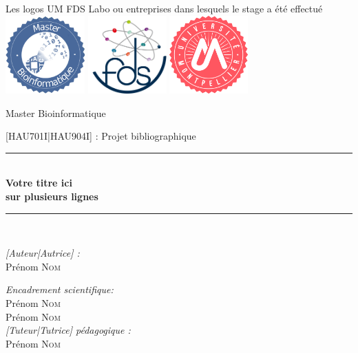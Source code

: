 \documentclass[french,a4paper,11pt]{article}
\begin{document}
\begin{titlepage}
\begin{center}
	  Les logos UM FDS Labo ou entreprises dans lesquels le stage a été effectué\\
	  \includegraphics[height=3cm]{Logo_Bioinfo.png}\hspace{0.2cm}
	  \includegraphics[height=3cm]{logo_fds_rond.png}\hspace{0.2cm}
	  \includegraphics[height=3cm]{logo_UM.png}\hspace{0.2cm}

{\Large Master Bioinformatique\\[1cm]}

{\large [HAU701I|HAU904I] : Projet bibliographique\\[0.7cm]}

\rule{\linewidth}{0.5mm} \\[0.4cm]
{ \huge \bfseries Votre titre ici\\sur plusieurs lignes \\[0.4cm] }
\rule{\linewidth}{0.5mm} \\[1.5cm]

\noindent
\begin{minipage}{0.4\textwidth}
  \begin{flushleft} \large
    \emph{[Auteur|Autrice] :}\\
    Prénom \textsc{Nom}\\
  \end{flushleft}
\end{minipage}
\begin{minipage}{0.5\textwidth}
  \begin{flushright} \large
    \emph{Encadrement scientifique:} \\
    Prénom \textsc{Nom}\\
    Prénom \textsc{Nom} \\
	\emph{[Tuteur|Tutrice] pédagogique :} \\
    Prénom \textsc{Nom}\\
  \end{flushright}
\end{minipage}


\end{center}
\end{titlepage}
\end{document}
